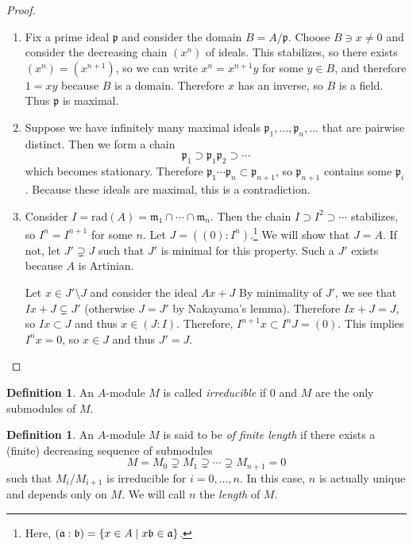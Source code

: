 \documentclass[leqno, openany]{memoir}
\theoremstyle{definition}
\newtheorem{defn}[thm]{Definition}
\theoremstyle{remark}
\theoremstyle{plain}
\theoremstyle{definition}
\theoremstyle{remark}
\newcommand{\mf}[1]{\mathfrak{#1}}
\newcommand{\mr}[1]{\mathrm{#1}}
\begin{document}
\begin{proof}
    \begin{enumerate}
        \item Fix a prime ideal $\mf{p}$ and consider the domain $B = A / \mf{p}$. Choose $B \ni x \neq 0$ and consider the decreasing chain $(x^n)$ of ideals. This stabilizes, so there exists $(x^n) = (x^{n+1})$, so we can write $x^n = x^{n+1}y$ for some $y \in B$, and therefore $1 = xy$ because $B$ is a domain. Therefore $x$ has an inverse, so $B$ is a field. Thus $\mf{p}$ is maximal.
        \item Suppose we have infinitely many maximal ideals $\mf{p}_1, \ldots, \mf{p}_n, \ldots$ that are pairwise distinct. Then we form a chain
            \[ \mf{p}_1 \supset \mf{p}_1\mf{p}_2 \supset \cdots \]
            which becomes stationary. Therefore $\mf{p}_1 \cdots \mf{p}_n \subset \mf{p}_{n+1}$, so $\mf{p}_{n+1}$ contains some $\mf{p}_i$. Because these ideals are maximal, this is a contradiction.
        \item Consider $I = \mr{rad}(A) = \mf{m}_1 \cap \cdots \cap \mf{m}_n$. Then the chain $I \supset I^2 \supset \cdots$ stabilizes, so $I^n = I^{n+1}$ for some $n$. Let $J = ((0): I^n)$.\footnote{Here, $(\mf{a}: \mf{b}) = \qty{x \in A \mid x\mf{b} \in \mf{a}}$.} We will show that $J = A$. If not, let $J' \supsetneq J$ such that $J'$ is minimal for this property. Such a $J'$ exists because $A$ is Artinian.

            Let $x \in J' \setminus J$ and consider the ideal $Ax + J$ By minimality of $J'$, we see that $Ix + J \subsetneq J'$ (otherwise $J = J'$ by Nakayama's lemma). Therefore $Ix + J = J$, so $Ix \subset J$ and thus $x \in (J:I)$. Therefore, $I^{n+1}x \subset I^n J = (0)$. This implies $I^nx = 0$, so $x \in J$ and thus $J' = J$. \qedhere
    \end{enumerate}
\end{proof}

\begin{defn}
    An $A$-module $M$ is called \textit{irreducible} if $0$ and $M$ are the only submodules of $M$.
\end{defn}

\begin{defn}
    An $A$-module $M$ is said to be \textit{of finite length}  if there exists a (finite) decreasing sequence of submodules 
    \[ M = M_0 \supsetneq M_1 \supsetneq \cdots \supsetneq M_{n+1} = 0 \]
    such that $M_i / M_{i+1}$ is irreducible for $i = 0, \ldots, n$. In this case, $n$ is actually unique and depends only on $M$. We will call $n$ the \textit{length} of $M$. 
\end{defn}
\end{document}
